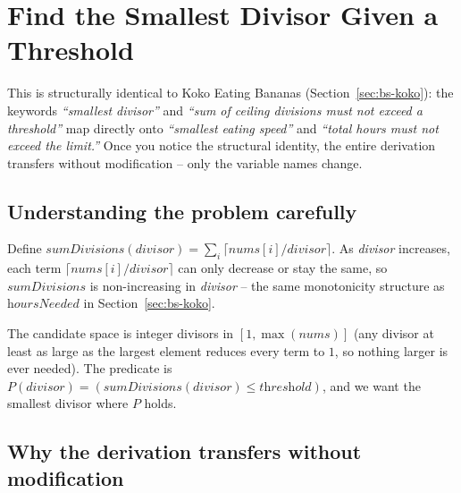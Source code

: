 \section{Find the Smallest Divisor Given a Threshold}
\label{sec:bs-smallest-divisor}


\begin{patternbox}
This is structurally identical to Koko Eating Bananas
(Section~\ref{sec:bs-koko}): the keywords \emph{``smallest divisor''} and
\emph{``sum of ceiling divisions must not exceed a threshold''} map
directly onto \emph{``smallest eating speed''} and \emph{``total hours
must not exceed the limit.''} Once you notice the structural identity, the
entire derivation transfers without modification -- only the variable
names change.
\end{patternbox}

\subsection*{Understanding the problem carefully}

Define $\textit{sumDivisions}(\textit{divisor}) = \sum_i \lceil
\textit{nums}[i] / \textit{divisor} \rceil$. As \textit{divisor} increases,
each term $\lceil \textit{nums}[i]/\textit{divisor} \rceil$ can only
decrease or stay the same, so $\textit{sumDivisions}$ is non-increasing in
\textit{divisor} -- the same monotonicity structure as
$\textit{hoursNeeded}$ in Section~\ref{sec:bs-koko}.

\begin{ideabox}
The candidate space is integer divisors in $[1, \max(\textit{nums})]$
(any divisor at least as large as the largest element reduces every term
to $1$, so nothing larger is ever needed). The predicate is
$P(\textit{divisor}) = (\textit{sumDivisions}(\textit{divisor}) \le
\textit{threshold})$, and we want the smallest divisor where $P$ holds.
\end{ideabox}

\subsection*{Why the derivation transfers without modification}

